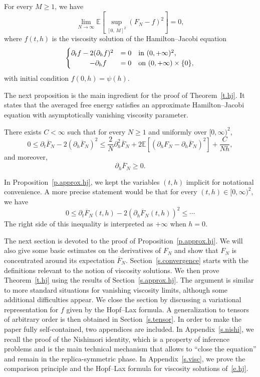 \documentclass[AHL,Unicode,longabstracts,published]{cedram}
\newcommand{\E}{\mathbb{E}}
\newcommand{\1}{\mathds{1}}
\renewcommand{\le}{\leqslant}
\renewcommand{\ge}{\geqslant}
\renewcommand{\bar}{\overline}
\begin{document}
\begin{theo}[Convergence to HJ]\label{t.hj}
For every $M \ge 1$, we have
\[
\lim_{N\to \infty} \E \left[\sup_{\left[0,\,M\right]^2} \left(F_N - f\right)^2 \right] = 0,
\]
where $f(t,h)$ is the viscosity solution of the Hamilton--Jacobi equation
\begin{equation}\label{e.hj}
\begin{cases}
\partial_t f - 2(\partial_{h} f)^2  &= 0 \quad  \text{in } (0,+\infty)^2, \\
\mkern48mu- \partial_h f & = 0 \quad  \text{on } (0,+\infty) \times \{0\},
\end{cases}
\end{equation}
with initial condition $f(0,h) = \psi(h)$.
\end{theo}
The next proposition is the main ingredient for the proof of Theorem~\ref{t.hj}. It states that the averaged free energy satisfies an approximate Hamilton--Jacobi equation with asymptotically vanishing viscosity parameter.
\begin{prop}
There exists $C < \infty$ such that for every $N \ge 1$ and uniformly over $[0,\infty)^2$,\label{p.approx.hj}
\[
0 \le \partial_t \bar F_N - 2\left(\partial_{h} \bar F_N\right)^2 \le \frac 2 {N} \partial_{h}^2 \bar F_N + 2 \E \left[\left(\partial_h F_N - \partial_h \bar F_N\right)^2 \right] +\frac{C}{Nh},
\]
and moreover,
\begin{equation}\label{e.boundary}
\partial_h \bar F_N\ge 0.
\end{equation}
\end{prop}

In Proposition~\ref{p.approx.hj}, we kept the variables $(t,h)$ implicit for notational convenience. A more precise statement would be that for every $(t,h) \in [0,\infty)^2$, we have
\[
0 \le \partial_t \bar F_N(t,h) - 2 \left(\partial_h\bar F_N(t,h) \right) ^2 \le \cdots
\]
The right side of this inequality is interpreted as $+\infty$ when $h = 0$.

The next section is devoted to the proof of Proposition~\ref{p.approx.hj}. We will also give some basic estimates on the derivatives of $F_N$ and show that $F_N$ is concentrated around its expectation $\bar F_N$. Section~\ref{s.convergence} starts with the definitions relevant to the notion of viscosity solutions. We then prove Theorem~\ref{t.hj} using the results of Section~\ref{s.approx.hj}. The argument is similar to more standard situations for vanishing viscosity limits, although some additional difficulties appear. We close the section by discussing a variational representation for $f$ given by the Hopf--Lax formula. A generalization to tensors of arbitrary order is then obtained in Section~\ref{s.tensor}. In order to make the paper fully self-contained, two appendices are included. In Appendix~\ref{s.nishi}, we recall the proof of the Nishimori identity, which is a property of inference problems and is the main technical mechanism that allows to ``close the equation'' and remain in the replica-symmetric phase. In Appendix~\ref{s.visc}, we prove the comparison principle and the Hopf--Lax formula for viscosity solutions of~\eqref{e.hj}.
\end{document}
